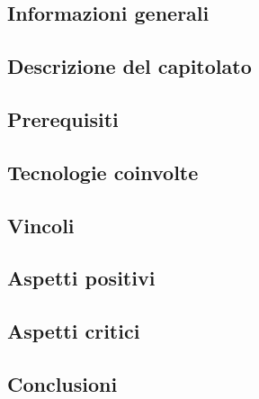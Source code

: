 
\subsection{Informazioni generali}


\subsection{Descrizione del capitolato}


\subsection{Prerequisiti}


\subsection{Tecnologie coinvolte}


\subsection{Vincoli}


\subsection{Aspetti positivi}


\subsection{Aspetti critici}


\subsection{Conclusioni}

